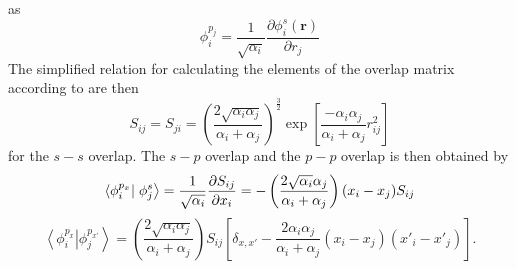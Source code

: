 as
\begin{equation}\phi_i^{p_j}=\frac{1}{\sqrt{\alpha_i}}\frac{\partial\phi_i^s(\mathbf{r})}{\partial r_j}\end{equation}
The simplified relation for calculating the elements of the overlap matrix according to \cite{Clementi1966} are then
\begin{equation}S_{ij}=S_{ji}=\left(\frac{2\sqrt{\alpha_i\alpha_j}}{\alpha_i+\alpha_j}\right)^\frac{3}{2}\exp\left[\frac{-\alpha_i\alpha_j}{\alpha_i+\alpha_j}r_{ij}^2\right]\end{equation}
for the $s-s$ overlap. The $s-p$ overlap and the $p-p$ overlap is then obtained by
\begin{equation}\left<\phi_i^{p_x}\right|\left.\phi_j^s\right>=\\ \frac{1}{\sqrt{\alpha_i}}\frac{\partial S_{ij}}{\partial x_i}=-\left(\frac{2\sqrt{\alpha_i}\alpha_j}{\alpha_i+\alpha_j}\right)(x_i-x_j)S_{ij}\end{equation}
\begin{equation}\left<\phi_i^{p_x}\right|\left.\phi_j^{p_{x'}}\right>=\left(\frac{2\sqrt{\alpha_i\alpha_j}}{\alpha_i+\alpha_j}\right)S_{ij}\left[\delta_{x,x'}-\frac{2\alpha_i\alpha_j}{\alpha_i+\alpha_j}(x_i-x_j)(x'_i-x'_j)\right].\end{equation}
